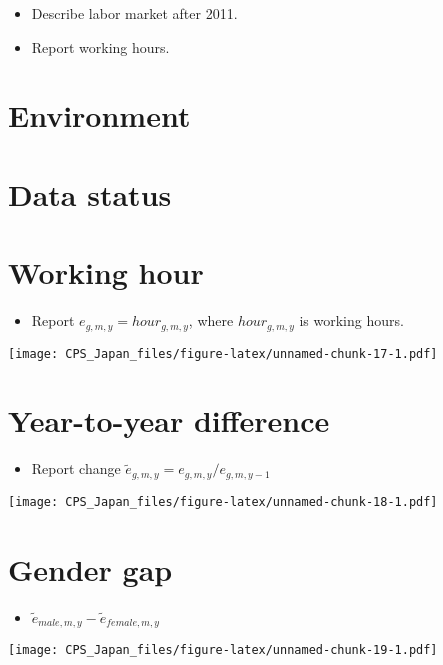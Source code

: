 \documentclass[
]{book}
\providecommand{\tightlist}{%
  \setlength{\itemsep}{0pt}\setlength{\parskip}{0pt}}
\begin{document}
\begin{itemize}
\item
  Describe labor market after 2011.
\item
  Report working hours.
\end{itemize}

\hypertarget{environment-3}{%
\section{Environment}\label{environment-3}}

\hypertarget{data-status-1}{%
\section{Data status}\label{data-status-1}}

\hypertarget{working-hour-1}{%
\section{Working hour}\label{working-hour-1}}

\begin{itemize}
\tightlist
\item
  Report \(e_{g,m,y} = hour_{g,m,y}\), where \(hour_{g,m,y}\) is working hours.
\end{itemize}

\texttt{[image: CPS\_Japan\_files/figure-latex/unnamed-chunk-17-1.pdf]}

\hypertarget{year-to-year-difference-3}{%
\section{Year-to-year difference}\label{year-to-year-difference-3}}

\begin{itemize}
\tightlist
\item
  Report change \(\tilde e_{g,m,y}=e_{g,m,y}/e_{g,m,y-1}\)
\end{itemize}

\texttt{[image: CPS\_Japan\_files/figure-latex/unnamed-chunk-18-1.pdf]}

\hypertarget{gender-gap-3}{%
\section{Gender gap}\label{gender-gap-3}}

\begin{itemize}
\tightlist
\item
  \(\tilde e_{male,m,y}-\tilde e_{female,m,y}\)
\end{itemize}

\texttt{[image: CPS\_Japan\_files/figure-latex/unnamed-chunk-19-1.pdf]}

  
\end{document}
